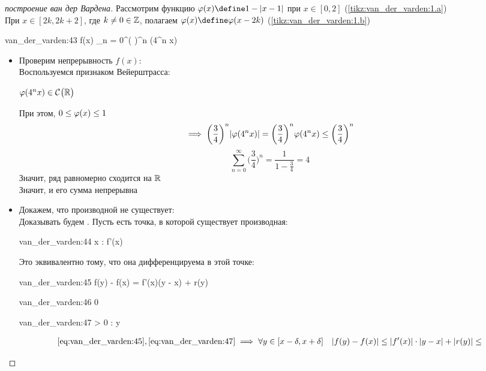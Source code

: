\begin{proof}[построение ван дер Вардена]
	Рассмотрим функцию $ \vphi(x) \define 1 - |x - 1| $ при $ x \in [0, 2] $ (\autoref{tikz:van_der_varden:1.a}) \\
	При $ x \in [2k, 2k + 2] $, где $ k \ne 0 \in \mathbb{Z} $, полагаем $ \vphi(x) \define \vphi(x - 2k) $ (\autoref{tikz:van_der_varden:1.b})
	\begin{equ}{van_der_varden:43}
		f(x)  \sum_{n = 0}^\infty \bigg(  \bigg)^n \vphi(4^n x)
	\end{equ}
	\begin{itemize}
		\item Проверим непрерывность $ f(x) $: \\
		Воспользуемся признаком Вейерштрасса:
		\begin{intuition}
			$ \varphi(4^n x) \in \mathcal{C}^{} \big( {\mathbb{R}} \big)  $
		\end{intuition}
		При этом, $ 0 \le \varphi(x) \le 1 $
		$$ \implies \bigg( \frac34 \bigg)^n |\varphi(4^n x) | = \bigg( \frac34 \bigg)^n \varphi(4^n x) \le \bigg( \frac34 \bigg)^n $$
		$$ \sum_{n = 0}^\infty \bigg( \frac34 \bigg)^n = \frac1{1 - \frac34} = 4 $$
		Значит, ряд  равномерно сходится на $ \mathbb{R} $ \\
		Значит, и его сумма непрерывна
		\item Докажем, что производной не существует: \\
		Доказывать будем . Пусть есть точка, в которой существует производная:
		\begin{equ}{van_der_varden:44}
			\exist x \in \R : \quad \exist f'(x)
		\end{equ}
		Это эквивалентно тому, что она дифференцируема в этой точке:
		\begin{equ}{van_der_varden:45}
			f(y) - f(x) = f'(x)(y - x) + r(y)
		\end{equ}
		\begin{equ}{van_der_varden:46}
			   0
		\end{equ}
		\begin{equ}{van_der_varden:47}
			 \bdef[\implies]{\lim} \exist \delta > 0 : \quad \forall y  \quad {} 
		\end{equ}
		\begin{multline}\lbl{van_der_varden:48}
			\eref{van_der_varden:45}, \eref{van_der_varden:47} \implies \forall y \in [x - \delta, x + \delta] \quad |f(y) - f(x)| \le |f'(x)| \cdot |y - x| + |r(y)| \le \\

\end{multline}
\end{itemize}
\end{proof}
